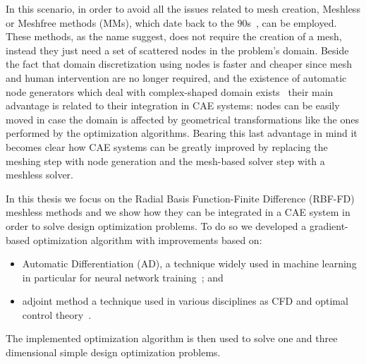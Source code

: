 \medskip
In this scenario, in order to avoid all the issues related to mesh creation, Meshless or Meshfree methods (MMs), which date back to the $90$s~\cite{Idelsohn:to_mesh_or_not_to_mesh}, can be employed. These methods, as the name suggest, does not require the creation of a mesh, instead they just need a set of scattered nodes in the problem's domain.
Beside the fact that domain discretization using nodes is faster and cheaper since mesh and human intervention are no longer required, and the existence of automatic node generators which deal with complex-shaped domain exists~\cite{Vlasiuk:node_generator,Zamolo:2D_node_generator} their main advantage is related to their integration in CAE systems: nodes can be easily moved in case the domain is affected by geometrical transformations like the ones performed by the optimization algorithms. Bearing this last advantage in mind it becomes clear how CAE systems can be greatly improved by replacing the meshing step with node generation and the mesh-based solver step with a meshless solver.

In this thesis we focus on the Radial Basis Function-Finite Difference (RBF-FD) meshless methods and we show how they can be integrated in a CAE system in order to solve design optimization problems. To do so we developed a gradient-based optimization algorithm with improvements based on:
\begin{itemize}
	\item Automatic Differentiation (AD), a technique widely used in machine learning in particular for neural network training~\cite{Rumelhart:backpropagation_algo}; and
	\item adjoint method a technique used in various disciplines as CFD and optimal control theory~\cite{Giles:adjoint_intro}.
\end{itemize}
The implemented optimization algorithm is then used to solve one and three dimensional simple design optimization problems.

